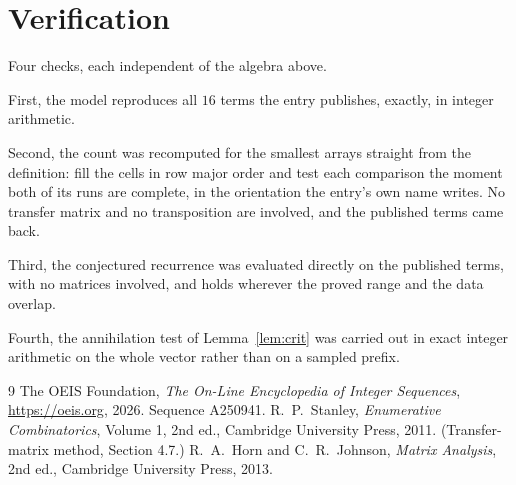 \documentclass[11pt,a4paper]{article}
\theoremstyle{plain}
\theoremstyle{definition}
\begin{document}
\section{Verification}

Four checks, each independent of the algebra above.

First, the model reproduces all $16$ terms the entry publishes, exactly, in integer
arithmetic.

Second, the count was recomputed for the smallest arrays straight from the definition: fill the
cells in row major order and test each comparison the moment both of its runs are complete,
in the orientation the entry's own name writes. No transfer matrix and no transposition are
involved, and the published terms came back.

Third, the conjectured recurrence was evaluated directly on the published terms, with no
matrices involved, and holds wherever the proved range and the data overlap.

Fourth, the annihilation test of Lemma~\ref{lem:crit} was carried out in exact integer
arithmetic on the whole vector rather than on a sampled prefix.

\begin{thebibliography}{9}
 The OEIS Foundation, \emph{The On-Line Encyclopedia of Integer
Sequences}, \url{https://oeis.org}, 2026. Sequence A250941.
 R.~P.~Stanley, \emph{Enumerative Combinatorics}, Volume 1, 2nd ed.,
Cambridge University Press, 2011. (Transfer-matrix method, Section 4.7.)
 R.~A.~Horn and C.~R.~Johnson, \emph{Matrix Analysis}, 2nd ed., Cambridge
University Press, 2013.
\end{thebibliography}
\end{document}
